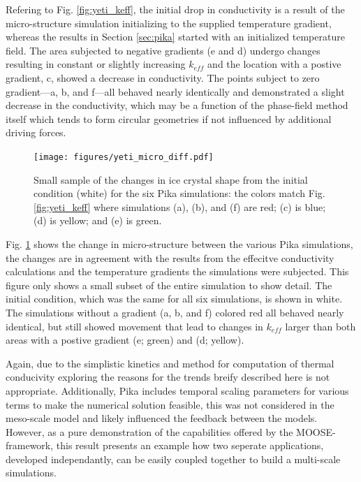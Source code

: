 Refering to Fig. \ref{fig:yeti_keff}, the initial drop in conductivity is a result of the micro-structure simulation initializing to the supplied temperature gradient, whereas the results in Section \ref{sec:pika} started with an initialized temperature field. The area subjected to negative gradients (e and d) undergo changes resulting in constant or slightly increasing $k_{eff}$ and the location with a postive gradient, c, showed a decrease in conductivity. The points subject to zero gradient---a, b, and f---all behaved nearly identically and demonstrated a slight decrease in the conductivity, which may be a function of the phase-field method itself which tends to form circular geometries if not influenced by additional driving forces.

\begin{figure}[t]
  \texttt{[image: figures/yeti\_micro\_diff.pdf]}
  \caption{Small sample of the changes in ice crystal shape from the initial condition (white) for the six Pika simulations: the colors match Fig. \ref{fig:yeti_keff} where simulations (a), (b), and (f) are red; (c) is blue; (d) is yellow; and (e) is green.}
  \label{fig:yeti_micro}
\end{figure}

Fig. \ref{fig:yeti_micro} shows the change in micro-structure between the various Pika simulations, the changes are in agreement with the results from the effecitve conductivity calculations and the temperature gradients the simulations were subjected. This figure only shows a small subset of the entire simulation to show detail. The initial condition, which was the same for all six simulations, is shown in white. The simulations without a gradient (a, b, and f) colored red all behaved nearly identical, but still showed movement that lead to changes in $k_{eff}$ larger than both areas with a postive gradient (e; green) and (d; yellow).

Again, due to the simplistic kinetics and method for computation of thermal conducivity exploring the reasons for the trends breify described here is not appropriate. Additionally, Pika includes temporal scaling parameters for various terms to make the numerical solution feasible, this was not considered in the meso-scale model and likely influenced the feedback between the models. However, as a pure demonstration of the capabilities offered by the MOOSE-framework, this result presents an example how two seperate applications, developed independantly, can be easily coupled together to build a multi-scale simulations.



